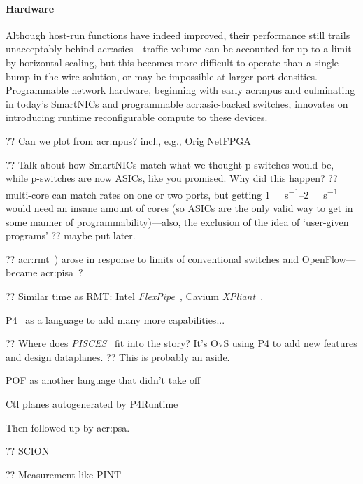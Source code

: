 \paragraph{Hardware}
Although host-run functions have indeed improved, their performance still trails unacceptably behind \glspl{acr:asic}---traffic volume can be accounted for up to a limit by horizontal scaling, but this becomes more difficult to operate than a single bump-in the wire solution, or may be impossible at larger port densities.
Programmable network hardware, beginning with early \glspl{acr:npu} and culminating in today's SmartNICs and programmable \gls{acr:asic}-backed switches, innovates on introducing runtime reconfigurable compute to these devices.

?? Can we plot from \glspl{acr:npu}? incl., e.g., Orig NetFPGA~\parencite{DBLP:conf/mse/LockwoodMWGHNRL07}

?? Talk about how SmartNICs match what we thought p-switches would be, while p-switches are now ASICs, like you promised. Why did this happen? ?? multi-core can match rates on one or two ports, but getting \qtyrange{1}{2}{\tera\bit\per\second} would need an insane amount of cores (so ASICs are the only valid way to get in some manner of programmability)---also, the exclusion of the idea of `user-given programs' ?? maybe put later.

?? \gls{acr:rmt}~\parencite{DBLP:conf/sigcomm/BosshartGKVMIMH13}) arose in response to limits of conventional switches and OpenFlow---became \gls{acr:pisa}~\parencite{barefoot-pisa}?

?? Similar time as RMT: Intel \emph{FlexPipe}~\parencite{flexpipe-fm5000}, Cavium \emph{XPliant}~\parencite{cavium-xpliant}.

P4~\parencite{DBLP:journals/ccr/BosshartDGIMRSTVVW14} as a language to add many more capabilities...

?? Where does \emph{PISCES}~\parencite{DBLP:conf/sigcomm/ShahbazCPKFMR16} fit into the story? It's OvS using P4 to add new features and design dataplanes. ?? This is probably an aside.

POF as another language that didn't take off~\parencite{DBLP:conf/sigcomm/Song13}

Ctl planes autogenerated by P4Runtime~\parencite{p4-runtime}

Then followed up by  \gls{acr:psa}\parencite{p4-psa}.

?? SCION~\parencite{DBLP:conf/conext/RuiterS21}

?? Measurement like PINT~\parencite{DBLP:conf/sigcomm/BasatRLAYM20}

